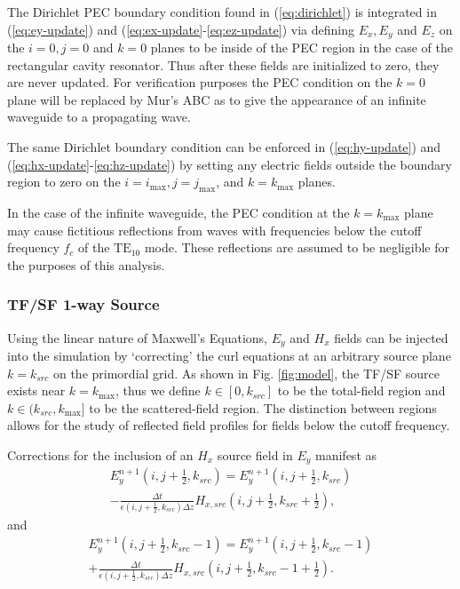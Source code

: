 The Dirichlet PEC boundary condition found in (\ref{eq:dirichlet}) is integrated in (\ref{eq:ey-update}) and (\ref{eq:ex-update}-\ref{eq:ez-update}) via defining $E_x, E_y$ and $E_z$ on the $i=0, j=0$ and $k=0$ planes to be inside of the PEC region in the case of the rectangular cavity resonator. Thus after these fields are initialized to zero, they are never updated. For verification purposes the PEC condition on the $k=0$ plane will be replaced by Mur's ABC as to give the appearance of an infinite waveguide to a propagating wave.

The same Dirichlet boundary condition can be enforced in  (\ref{eq:hy-update}) and (\ref{eq:hx-update}-\ref{eq:hz-update}) by setting any electric fields outside the boundary region to zero on the $i=i_{\max}, j=j_{\max}$, and $k=k_{\max}$ planes. 

In the case of the infinite waveguide, the PEC condition at the $k=k_{\max}$ plane may cause fictitious reflections from waves with frequencies below the cutoff frequency $f_c$ of the $\mathrm{TE_{10}}$ mode. These reflections are assumed to be negligible for the purposes of this analysis.  

\subsubsection{TF/SF 1-way Source}
\label{subsubsec:tfsf-timestep}
Using the linear nature of Maxwell's Equations, $E_y$ and $H_x$ fields can be injected into the simulation by `correcting' the curl equations at an arbitrary source plane $k=k_{src}$ on the primordial grid. As shown in Fig. \ref{fig:model}, the TF/SF source exists near $k=k_{\max}$, thus we define $k\in[0,k_{src}]$ to be the total-field region and $k\in(k_{src},k_{\max}]$ to be the scattered-field region. The distinction between regions allows for the study of reflected field profiles for fields below the cutoff frequency.

Corrections for the inclusion of an $H_x$ source field in $E_y$ manifest as
\begin{multline}
	E_y^{n+1}(i,j+\tfrac{1}{2},k_{src}) = E_y^{n+1}(i,j+\tfrac{1}{2},k_{src}) \\ - \frac{\Delta t}{\epsilon(i,j+\tfrac{1}{2},k_{src})\Delta z}H_{x,src}(i,j+\tfrac{1}{2},k_{src}+\tfrac{1}{2}),
\end{multline}
and
\begin{multline}
	E_y^{n+1}(i,j+\tfrac{1}{2},k_{src}-1) = E_y^{n+1}(i,j+\tfrac{1}{2},k_{src}-1) \\ + \frac{\Delta t}{\epsilon(i,j+\tfrac{1}{2},k_{src})\Delta z}H_{x,src}(i,j+\tfrac{1}{2},k_{src}-1+\tfrac{1}{2}).
\end{multline}

